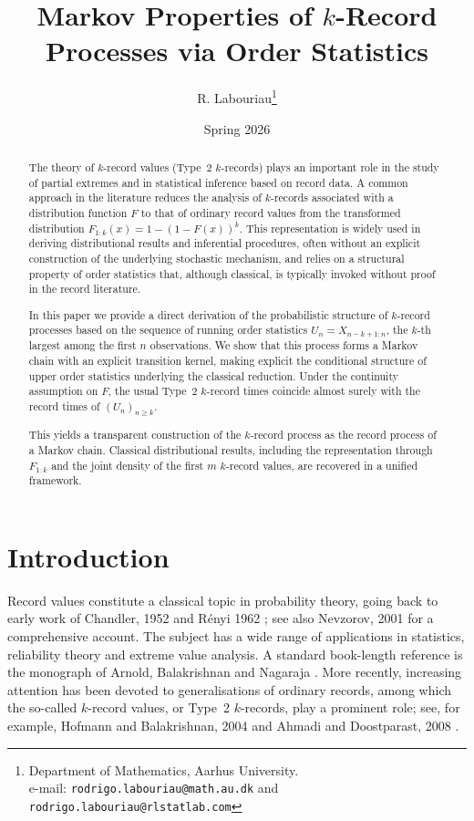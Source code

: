 \documentclass[12pt]{article}
\title{Markov Properties of $k$-Record Processes via Order Statistics}
\author{R. Labouriau\footnote{Department of Mathematics, Aarhus University.\\
                                   e-mail:   \texttt{rodrigo.labouriau@math.au.dk} and
                                                 \texttt{rodrigo.labouriau@rlstatlab.com}}
}
\date{Spring 2026}
\theoremstyle{definition}
\newcommand{\Ften} {\fontsize{10}{11}\selectfont  }
\begin{document}
\maketitle

\begin{abstract}  \Ften
The theory of $k$-record values (Type~2 $k$-records) plays an important
role in the study of partial extremes and in statistical inference based
on record data. A common approach in the literature reduces the analysis
of $k$-records associated with a distribution function $F$ to that of
ordinary record values from the transformed distribution
$F_{1:k}(x)=1-(1-F(x))^k$. This representation is widely used in
deriving distributional results and inferential procedures, often without
an explicit construction of the underlying stochastic mechanism, and
relies on a structural property of order statistics that, although
classical, is typically invoked without proof in the record literature.

In this paper we provide a direct derivation of the probabilistic
structure of $k$-record processes based on the sequence of running order
statistics $U_n=X_{n-k+1:n}$, the $k$-th largest among the first $n$
observations. We show that this process forms a Markov chain with an
explicit transition kernel, making explicit the conditional structure of
upper order statistics underlying the classical reduction. Under the
continuity assumption on $F$, the usual Type~2 $k$-record times coincide
almost surely with the record times of $(U_n)_{n\ge k}$.

This yields a transparent construction of the $k$-record process as the
record process of a Markov chain. Classical distributional results,
including the representation through $F_{1:k}$ and the joint density of
the first $m$ $k$-record values, are recovered in a unified framework.
\end{abstract}

 \newpage
 \tableofcontents
 \newpage
\section{Introduction}\label{sec:introduction}

Record values constitute a classical topic in probability theory, going back to early work of Chandler, 1952 \cite{Chandler1952} and Rényi 1962 \cite{Renyi1962}; see also Nevzorov, 2001 \cite {Nevzorov2001} for a comprehensive account. The subject has a wide range of applications in statistics, reliability theory and extreme value analysis. A standard book-length reference is the monograph of Arnold, Balakrishnan and Nagaraja \cite{ArnoldBalakrishnanNagaraja1998}. More recently, increasing attention has been devoted to generalisations of ordinary records, among which the so-called $k$-record values, or Type~2 $k$-records, play a prominent role; see, for example, Hofmann and Balakrishnan, 2004 \cite{HofmannBalakrishnan2004} and Ahmadi and Doostparast, 2008 \cite{AhmadiDoostparast2008}.
\end{document}
